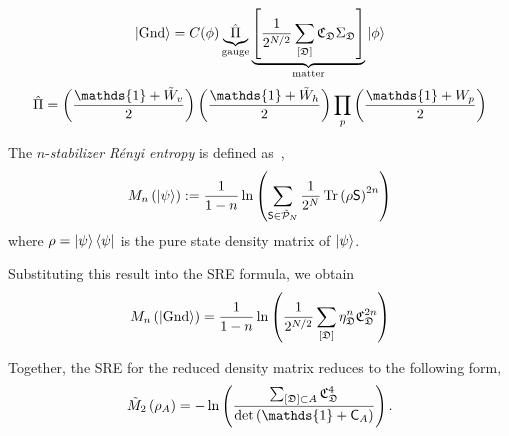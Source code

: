{
\[
    \ket{\mathrm{Gnd}}
    =
    C(\phi)
    \underbrace{
    \hat{\Pi}
    }_{\text{gauge}}
    \underbrace{
    \left[ 
        \frac{1}{2^{N/2}}
        \sum_{[\mathfrak{D}]} \mathfrak{C}_{\mathfrak{D}}
        \Sigma_\mathfrak{D}
     \right]
    }_{\text{matter}}
    \ket{\phi}
\]
\[
\hat{\Pi}
=
\lr{\frac{\mathds{1} + \tilde{W}_v}{2}} 
    \lr{\frac{\mathds{1} + \tilde{W}_h}{2}}
    \prod_{p} \lr{\frac{\mathds{1} + W_p}{2}}
\]


The $n$-\textit{stabilizer R\'enyi entropy} is defined as~\cite{Leone-Oliviero-Hamma_2022},
\begin{equation}\label{eq:stab-renyi-def}
    M_{n}\left( \ket{\psi} \right) := 
    \frac{1}{1 - n} 
    \ln\left( 
        \sum_{\mathsf{S}\in\tilde{\mathcal{P}}_N}
        \frac{1}{2^N}
        \Tr\left( \rho\mathsf{S} \right)^{2n}
     \right)
\end{equation}
where $\rho = \ket{\psi}\bra{\psi}$ is the pure state density matrix of $\ket{\psi}$.

Substituting this result into the SRE formula, we obtain
\begin{equation}
    M_n\left( \ket{\mathrm{Gnd}} \right) 
    =
    \frac{1}{1 - n}
    \ln\left( 
        \frac{1}{2^{N/2}}
        \sum_{[\mathfrak{D}]} \eta_\mathfrak{D}^n \mathfrak{C}_\mathfrak{D}^{2n}
     \right)
\end{equation}

Together, the SRE for the reduced density matrix reduces to the following form,
\begin{equation}\label{eq:RDM-SRE}
    \tilde{M}_2\lr{\rho_A} = 
    -\ln\lr{
        \frac{
        \sum_{[\mathfrak{D}]\subset A} \mathfrak{C}_\mathfrak{D}^4 
        }
        {
        \det\lr{
            \mathds{1} + \mathsf{C}_A
        }
        } 
    }
    .
\end{equation}
}


